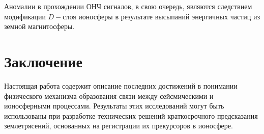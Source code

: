 \documentclass[12pt, oneside, a4paper]{article}
\begin{document}
Аномалии в прохождении ОНЧ сигналов, в свою очередь, являются следствием модификации $D-$слоя ионосферы в результате высыпаний энергичных частиц из земной магнитосферы.
\section{Заключение}
Настоящая работа содержит описание последних достижений в понимании физического механизма образования связи между сейсмическими и ионосферными процессами. Результаты этих исследований могут быть использованы при разработке технических решений краткосрочного предсказания землетрясений, основанных на регистрации их прекурсоров в ионосфере. 
\newpage


\end{document}
